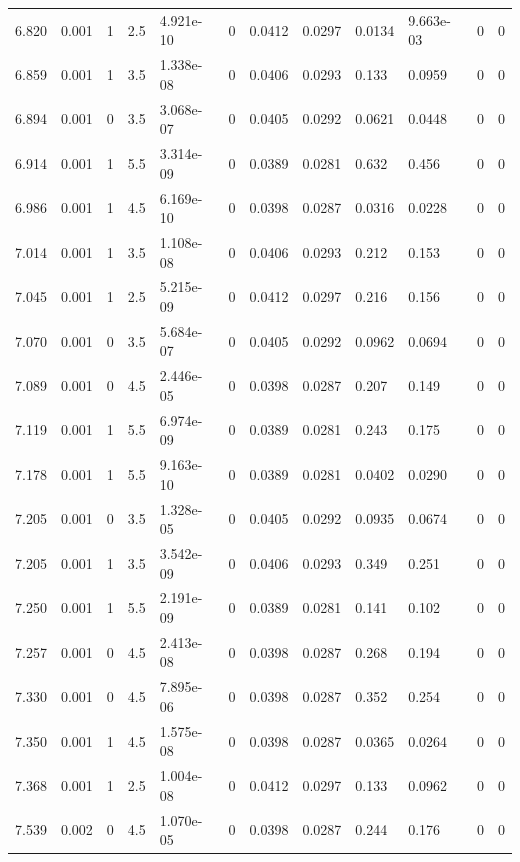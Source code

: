 \documentclass[preview]{standalone}
\begin{document}
{{{{{\begin{tabular}{L{1.2cm}C{1.2cm} C{0.3cm}C{0.5cm} C{1.4cm}C{1.4cm} C{1.4cm}C{1.4cm} C{1.6cm}C{1.6cm} C{1.6cm}C{1.6cm}}
  6.820  &  0.001  & 1     & 2.5 &  4.921e-10  & 0  &  0.0412&   0.0297& 0.0134 & 9.663e-03   &  0 & 0  \\ 
  6.859  &  0.001  & 1     & 3.5 &  1.338e-08  & 0  &  0.0406&   0.0293& 0.133 & 0.0959   &  0 & 0  \\ 
  6.894  &  0.001  & 0     & 3.5 &  3.068e-07  & 0  &  0.0405&   0.0292& 0.0621 & 0.0448   &  0 & 0  \\ 
  6.914  &  0.001  & 1     & 5.5 &  3.314e-09  & 0  &  0.0389&   0.0281& 0.632 & 0.456   &  0 & 0  \\ 
  6.986  &  0.001  & 1     & 4.5 &  6.169e-10  & 0  &  0.0398&   0.0287& 0.0316 & 0.0228   &  0 & 0  \\ 
  7.014  &  0.001  & 1     & 3.5 &  1.108e-08  & 0  &  0.0406&   0.0293& 0.212 & 0.153   &  0 & 0  \\ 
  7.045  &  0.001  & 1     & 2.5 &  5.215e-09  & 0  &  0.0412&   0.0297& 0.216 & 0.156   &  0 & 0  \\ 
  7.070  &  0.001  & 0     & 3.5 &  5.684e-07  & 0  &  0.0405&   0.0292& 0.0962 & 0.0694   &  0 & 0  \\ 
  7.089  &  0.001  & 0     & 4.5 &  2.446e-05  & 0  &  0.0398&   0.0287& 0.207 & 0.149   &  0 & 0  \\ 
  7.119  &  0.001  & 1     & 5.5 &  6.974e-09  & 0  &  0.0389&   0.0281& 0.243 & 0.175   &  0 & 0  \\ 
  7.178  &  0.001  & 1     & 5.5 &  9.163e-10  & 0  &  0.0389&   0.0281& 0.0402 & 0.0290   &  0 & 0  \\ 
  7.205  &  0.001  & 0     & 3.5 &  1.328e-05  & 0  &  0.0405&   0.0292& 0.0935 & 0.0674   &  0 & 0  \\ 
  7.205  &  0.001  & 1     & 3.5 &  3.542e-09  & 0  &  0.0406&   0.0293& 0.349 & 0.251   &  0 & 0  \\ 
  7.250  &  0.001  & 1     & 5.5 &  2.191e-09  & 0  &  0.0389&   0.0281& 0.141 & 0.102   &  0 & 0  \\ 
  7.257  &  0.001  & 0     & 4.5 &  2.413e-08  & 0  &  0.0398&   0.0287& 0.268 & 0.194   &  0 & 0  \\ 
  7.330  &  0.001  & 0     & 4.5 &  7.895e-06  & 0  &  0.0398&   0.0287& 0.352 & 0.254   &  0 & 0  \\ 
  7.350  &  0.001  & 1     & 4.5 &  1.575e-08  & 0  &  0.0398&   0.0287& 0.0365 & 0.0264   &  0 & 0  \\ 
  7.368  &  0.001  & 1     & 2.5 &  1.004e-08  & 0  &  0.0412&   0.0297& 0.133 & 0.0962   &  0 & 0  \\ 
  7.539  &  0.002  & 0     & 4.5 &  1.070e-05  & 0  &  0.0398&   0.0287& 0.244 & 0.176   &  0 & 0  \\ 

\end{tabular}}}}}}
\end{document}
